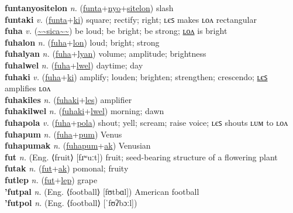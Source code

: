 \textbf{funtanyositelon} \textit{n.} (\hyperref[funta]{funta}+\hyperref[nyo]{nyo}+\hyperref[sitelon]{sitelon})
slash \label{funtanyositelon} \\
\textbf{funtaki} \textit{v.} (\hyperref[funta]{funta}+\hyperref[ki]{ki})
square; rectify; right; ʟєꜱ makes ʟᴏᴧ rectangular \label{funtaki} \\
\textbf{fuha} \textit{v.} (\hyperref[sica]{\~{}\~{}sica\~{}\~{}})
be loud; be bright; be strong; \hyperref[fuhalon]{ʟᴏᴧ} is bright \label{fuha} \\
\textbf{fuhalon} \textit{n.} (\hyperref[fuha]{fuha}+\hyperref[lon]{lon})
loud; bright; strong \label{fuhalon} \\
\textbf{fuhalyan} \textit{n.} (\hyperref[fuha]{fuha}+\hyperref[lyan]{lyan})
volume; amplitude; brightness \label{fuhalyan} \\
\textbf{fuhalwel} \textit{n.} (\hyperref[fuha]{fuha}+\hyperref[lwel]{lwel})
daytime; day \label{fuhalwel} \\
\textbf{fuhaki} \textit{v.} (\hyperref[fuha]{fuha}+\hyperref[ki]{ki})
amplify; louden; brighten; strengthen; crescendo; \hyperref[fuhakiles]{ʟєꜱ} amplifies ʟᴏᴧ \label{fuhaki} \\
\textbf{fuhakiles} \textit{n.} (\hyperref[fuhaki]{fuhaki}+\hyperref[les]{les})
amplifier \label{fuhakiles} \\
\textbf{fuhakilwel} \textit{n.} (\hyperref[fuhaki]{fuhaki}+\hyperref[lwel]{lwel})
morning; dawn \label{fuhakilwel} \\
\textbf{fuhapola} \textit{v.} (\hyperref[fuha]{fuha}+\hyperref[pola]{pola})
shout; yell; scream; raise voice; ʟєꜱ shouts ʟᴜᴍ to ʟᴏᴧ \label{fuhapola} \\
\textbf{fuhapum} \textit{n.} (\hyperref[fuha]{fuha}+\hyperref[pum]{pum})
Venus \label{fuhapum} \\
\textbf{fuhapumak} \textit{n.} (\hyperref[fuhapum]{fuhapum}+\hyperref[ak]{ak})
Venusian \label{fuhapumak} \\
\textbf{fut} \textit{n.} (Eng. ⟨fruit⟩ [fɹʷuːt])
fruit; seed-bearing structure of a flowering plant \label{fut} \\
\textbf{futak} \textit{n.} (\hyperref[fut]{fut}+\hyperref[ak]{ak})
pomonal; fruity \label{futak} \\
\textbf{futlep} \textit{n.} (\hyperref[fut]{fut}+\hyperref[lep]{lep})
grape \label{futlep} \\
\textbf{'futpal} \textit{n.} (Eng. ⟨football⟩ [fʊtbɑl])
American football \label{'futpal} \\
\textbf{'futpol} \textit{n.} (Eng. ⟨football⟩ [ˈfʊʔbɔːl])
